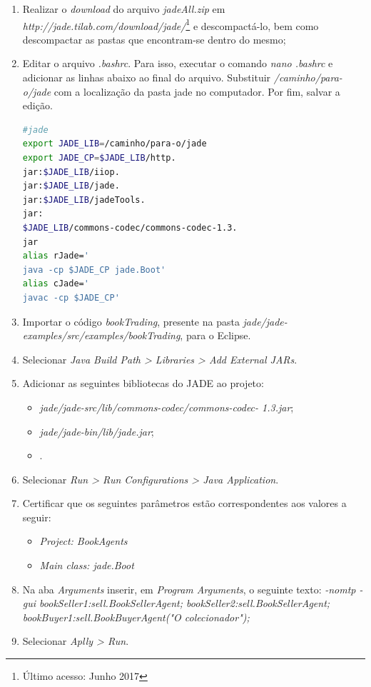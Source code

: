 \begin{enumerate}
    \item Realizar o \textit{download} do arquivo \textit{jadeAll.zip} em \textit{http://jade.tilab.com/download/jade/}\footnote{Último acesso: Junho 2017} e descompactá-lo, bem como descompactar as pastas que encontram-se dentro do mesmo;
    \item Editar o arquivo \textit{.bashrc}. Para isso, executar o comando \textit{nano .bashrc} e adicionar as linhas abaixo ao final do arquivo. Substituir \textit{/caminho/para-o/jade} com a localização da pasta jade no computador. Por fim, salvar a edição. 
\begin{lstlisting}[numbers=none, language=bash]
#jade
export JADE_LIB=/caminho/para-o/jade
export JADE_CP=$JADE_LIB/http.
jar:$JADE_LIB/iiop.
jar:$JADE_LIB/jade.
jar:$JADE_LIB/jadeTools.
jar:
$JADE_LIB/commons-codec/commons-codec-1.3.
jar
alias rJade='
java -cp $JADE_CP jade.Boot'
alias cJade='
javac -cp $JADE_CP'
\end{lstlisting}
    \item Importar o código \textit{bookTrading}, presente na pasta \textit{jade/jade-examples/src/examples/bookTrading}, para o Eclipse.
    \item Selecionar \textit{Java Build Path > Libraries > Add External JARs}.
    \item Adicionar as seguintes bibliotecas do JADE ao projeto:
    \begin{itemize}
        \item \textit{jade/jade-src/lib/commons-codec/commons-codec-
1.3.jar};
        \item \textit{jade/jade-bin/lib/jade.jar}; 
        \item {}.
    \end{itemize}
    \item Selecionar \textit{Run > Run Configurations > Java Application}.
    \item Certificar que os seguintes parâmetros estão correspondentes aos valores a seguir:
    \begin{itemize}
        \item \textit{Project: BookAgents}
        \item \textit{Main class: jade.Boot}
    \end{itemize}
    \item Na aba \textit{Arguments} inserir, em \textit{Program Arguments}, o seguinte texto:
    \textit{-nomtp -gui bookSeller1:sell.BookSellerAgent; bookSeller2:sell.BookSellerAgent; bookBuyer1:sell.BookBuyerAgent("O colecionador");}
    \item Selecionar \textit{Aplly > Run}.
\end{enumerate}


